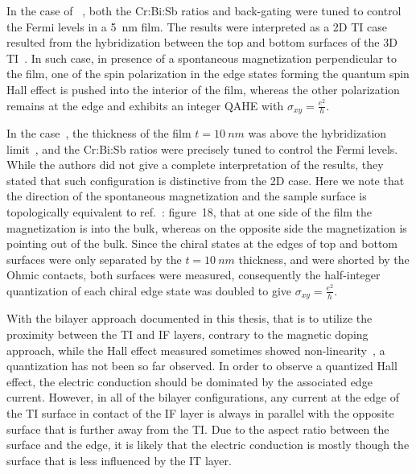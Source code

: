 In the case of \citeauthor{Chang2013}~\cite{Chang2013}, both the Cr:Bi:Sb ratios and back-gating were tuned to control the Fermi levels in a \SI{5}{nm} film. The results were interpreted as a 2D TI case resulted from the hybridization between the top and bottom surfaces of the 3D TI~\cite{QAH_TI_Yu, 2d_crossover}. In such case, in presence of a spontaneous magnetization perpendicular to the film, one of the spin polarization in the edge states forming the quantum spin Hall effect is pushed into the interior of the film, whereas the other polarization remains at the edge and exhibits an integer QAHE with $\sigma_{xy} = \frac{e^2}{h}$.

In the \citeauthor{Chang2013} case~\cite{Chang2013}, the thickness of the film $t=\SI{10}{nm}$ was above the hybridization limit~\cite{ARPES_thickness}, and the Cr:Bi:Sb ratios were precisely tuned to control the Fermi levels. While the authors did not give a complete interpretation of the results, they stated that such configuration is distinctive from the 2D case. Here we note that the direction of the spontaneous magnetization and the sample surface is topologically equivalent to ref.~\cite{TI_Col}: figure~18, that at one side of the film the magnetization is into the bulk, whereas on the opposite side the magnetization is pointing out of the bulk. Since the chiral states at the edges of top and bottom surfaces were only separated by the $t=\SI{10}{nm}$ thickness, and were shorted by the Ohmic contacts, both surfaces were measured, consequently the half-integer quantization of each chiral edge state was doubled to give $\sigma_{xy} = \frac{e^2}{h}$.

With the bilayer approach documented in this thesis, that is to utilize the proximity between the TI and IF layers, contrary to the magnetic doping approach, while the Hall effect measured sometimes showed non-linearity~\cite{Samarth2017, Petta2014}, a quantization has not been so far observed. In order to observe a quantized Hall effect, the electric conduction should be dominated by the associated edge current. However, in all of the bilayer configurations, any current at the edge of the TI surface in contact of the IF layer is always in parallel with the opposite surface that is further away from the TI. Due to the aspect ratio between the surface and the edge, it is likely that the electric conduction is mostly though the surface that is less influenced by the IT layer.